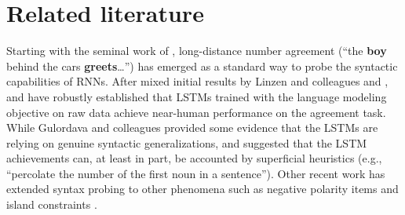 
\section{Related literature}



Starting with the seminal work of ,
long-distance number agreement (``the \textbf{boy} behind the cars
\textbf{greets}\ldots'') has emerged as a standard way to probe the
syntactic capabilities of RNNs. After
mixed initial results by Linzen and colleagues and
,  and
 have robustly established that LSTMs
trained with the language modeling objective on raw data achieve
near-human performance on the agreement task. While Gulordava and
colleagues provided some evidence that the LSTMs are relying on
genuine syntactic generalizations,  and
 suggested that the LSTM achievements
can, at least in part, be accounted by superficial heuristics (e.g., ``percolate the number of the first noun in a sentence''). Other
recent work has extended syntax probing to other phenomena such as
negative polarity items and island constraints
\cite{Chowdhury:Zamparelli:2018,jumelet2018language,marvin2018targeted,wilcox2018rnn}.

